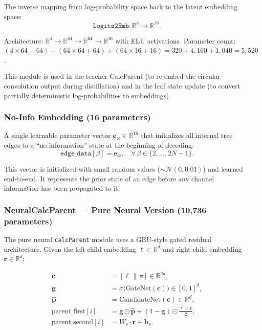\documentclass[11pt,a4paper]{article}
\newcommand{\R}{\mathbb{R}}
\begin{document}
The inverse mapping from log-probability space back to the latent embedding space:
\begin{equation}
    \texttt{Logits2Emb}: \R^4 \to \R^{16}.
\end{equation}

Architecture: $\R^{4} \to \R^{64} \to \R^{64} \to \R^{16}$ with ELU activations. Parameter count: $(4 \times 64 + 64) + (64 \times 64 + 64) + (64 \times 16 + 16) = 320 + 4{,}160 + 1{,}040 = 5{,}520$.

This module is used in the teacher CalcParent (to re-embed the circular convolution output during distillation) and in the leaf state update (to convert partially deterministic log-probabilities to embeddings).

\subsubsection{No-Info Embedding (16 parameters)}

A single learnable parameter vector $\bm{e}_{\varnothing} \in \R^{16}$ that initializes all internal tree edges to a ``no information'' state at the beginning of decoding:
\begin{equation}
    \texttt{edge\_data}[\beta] = \bm{e}_{\varnothing}, \quad \forall\, \beta \in \{2, \ldots, 2N - 1\}.
\end{equation}

This vector is initialized with small random values ($\sim \mathcal{N}(0, 0.01)$) and learned end-to-end. It represents the prior state of an edge before any channel information has been propagated to it.

\subsubsection{NeuralCalcParent --- Pure Neural Version (10,736 parameters)}

The pure neural \texttt{calcParent} module uses a GRU-style gated residual architecture. Given the left child embedding $\bm{\ell} \in \R^d$ and right child embedding $\bm{r} \in \R^d$:

\begin{align}
    \bm{c} &= [\bm{\ell} \,\|\, \bm{r}] \in \R^{2d}, \\
    \bm{g} &= \sigma\bigl(\text{GateNet}(\bm{c})\bigr) \in [0, 1]^d, \label{eq:gate}\\
    \hat{\bm{p}} &= \text{CandidateNet}(\bm{c}) \in \R^d, \label{eq:candidate}\\
    \text{parent\_first}[i] &= \bm{g} \odot \hat{\bm{p}} + (1 - \bm{g}) \odot \frac{\bm{\ell} + \bm{r}}{2}, \label{eq:gru_residual}\\
    \text{parent\_second}[i] &= W_s \cdot \bm{r} + \bm{b}_s. \label{eq:parent_second}
\end{align}
\end{document}
